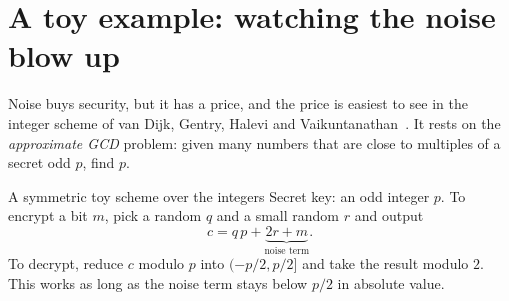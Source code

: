 \documentclass[11pt,a4paper]{article}
\begin{document}
\section{A toy example: watching the noise blow up}

Noise buys security, but it has a price, and the price is easiest to see in
the integer scheme of van Dijk, Gentry, Halevi and Vaikuntanathan~\cite{dghv}.
It rests on the \emph{approximate GCD} problem: given many numbers that are
close to multiples of a secret odd $p$, find $p$.

\begin{formal}{A symmetric toy scheme over the integers}
Secret key: an odd integer $p$. To encrypt a bit $m$, pick a random $q$ and a
small random $r$ and output
\[
c=q\,p+\underbrace{2r+m}_{\text{noise term}} .
\]
To decrypt, reduce $c$ modulo $p$ into $(-p/2,p/2]$ and take the result
modulo $2$. This works as long as the noise term stays below $p/2$ in
absolute value.
\end{formal}



\end{document}

